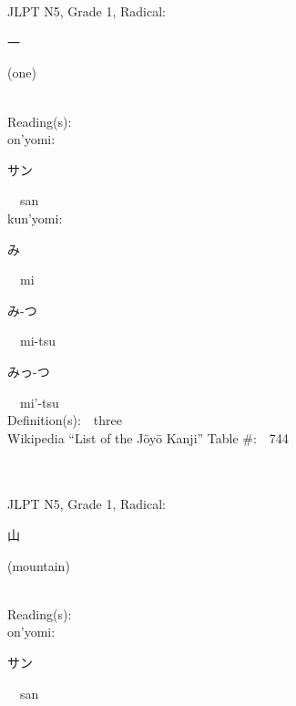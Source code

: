 \begin{multicols}{2}
\ \ \\
{\fontsize{34pt}{40pt}  }\ \ \\  %
{JLPT N5, Grade 1, Radical:\ \ {\begin{CJK}{UTF8}{min} 一 \end{CJK}} (one) } \\
Reading(s):\ \ \\
{\hspace*{1em}}on'yomi:\ \ \\
{\hspace*{2em}}{\begin{CJK}{UTF8}{min} サン \end{CJK}}\ \ san\ \ \\
{\hspace*{1em}}kun'yomi:\ \ \\
{\hspace*{2em}}{\begin{CJK}{UTF8}{min} み \end{CJK}}\ \ mi\ \ \\
{\hspace*{2em}}{\begin{CJK}{UTF8}{min} み-つ \end{CJK}}\ \ mi-tsu\ \ \\
{\hspace*{2em}}{\begin{CJK}{UTF8}{min} みっ-つ \end{CJK}}\ \ mi'-tsu\ \ \\
Definition(s):\ \ three \\
Wikipedia ``List of the J\=oy\=o Kanji'' Table \#:\ \ 744 \\
\ \ \\
{\fontsize{34pt}{40pt}  }\ \ \\  %
{JLPT N5, Grade 1, Radical:\ \ {\begin{CJK}{UTF8}{min} 山 \end{CJK}} (mountain) } \\
Reading(s):\ \ \\
{\hspace*{1em}}on'yomi:\ \ \\
{\hspace*{2em}}{\begin{CJK}{UTF8}{min} サン \end{CJK}}\ \ san\ \ \\

\end{multicols}
